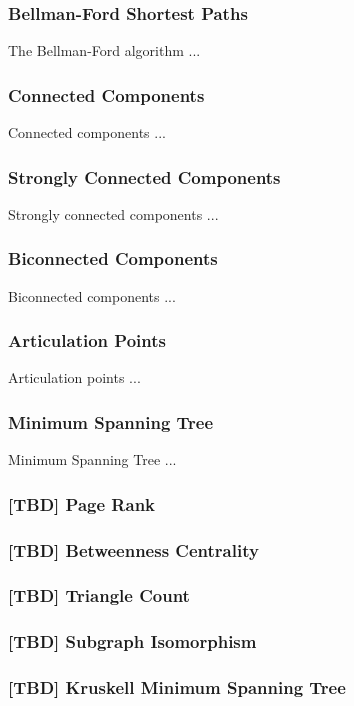 \documentclass[10pt,onecolumn]{article}
\begin{document}
\subsubsection{Bellman-Ford Shortest Paths}
The Bellman-Ford algorithm \cite{REF_} ...

\subsubsection{Connected Components}
Connected components \cite{REF_} ...

\subsubsection{Strongly Connected Components}
Strongly connected components \cite{REF_} ...

\subsubsection{Biconnected Components}
Biconnected components \cite{REF_} ...

\subsubsection{Articulation Points}
Articulation points \cite{REF_} ...

\subsubsection{Minimum Spanning Tree}
Minimum Spanning Tree \cite{REF_} ...

\subsubsection{[TBD] Page Rank}
\subsubsection{[TBD] Betweenness Centrality}
\subsubsection{[TBD] Triangle Count}
\subsubsection{[TBD] Subgraph Isomorphism}
\subsubsection{[TBD] Kruskell Minimum Spanning Tree}
\end{document}
